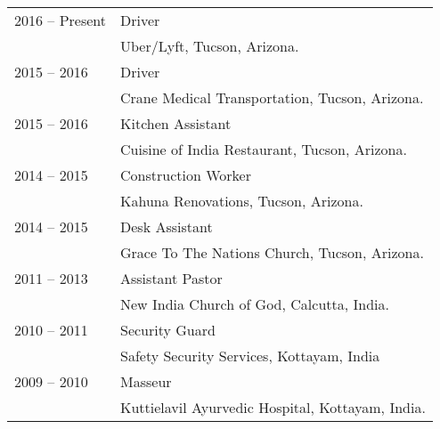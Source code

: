 \documentclass[10pt]{article}
\begin{document}
\begin{description}
\begin{tabular}{lp{4.9in}}


\hspace{-.2cm}2016 -- Present & Driver \\\vspace{.1cm}
& {\sc Uber/Lyft, Tucson, Arizona.} \\

\hspace{-.2cm}2015 -- 2016 & Driver\\\vspace{.1cm}
& {\sc Crane Medical Transportation, Tucson, Arizona.} \\

\hspace{-.2cm}2015 -- 2016 & Kitchen Assistant \\\vspace{.1cm}
&  {\sc Cuisine of India Restaurant, Tucson, Arizona.} \\

\hspace{-.2cm}2014 -- 2015 & Construction Worker\\\vspace{.1cm}
&  {\sc Kahuna Renovations, Tucson, Arizona.} \\

\hspace{-.2cm}2014 -- 2015 & Desk Assistant \\\vspace{.1cm}
& {\sc Grace To The Nations Church, Tucson, Arizona.} \\

\hspace{-.2cm}2011 -- 2013 & Assistant Pastor \\\vspace{.1cm}
& {\sc New India Church of God, Calcutta, India.} \\

\hspace{-.2cm}2010 -- 2011 & Security Guard\\\vspace{.1cm}
& {\sc Safety Security Services, Kottayam, India}\\


\hspace{-.2cm}2009 -- 2010 & Masseur  \\\vspace{.1cm}
& {\sc Kuttielavil Ayurvedic Hospital, Kottayam, India.} \\



\end{tabular}
\end{description}
\end{document}
